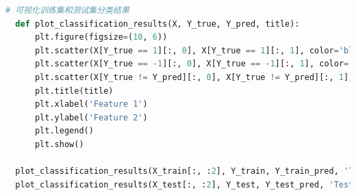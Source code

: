 \documentclass[12pt]{article}
\begin{document}
\begin{lstlisting}[language=Python]
  # 可视化训练集和测试集分类结果
  def plot_classification_results(X, Y_true, Y_pred, title):
      plt.figure(figsize=(10, 6))
      plt.scatter(X[Y_true == 1][:, 0], X[Y_true == 1][:, 1], color='blue', label='Positive Class')
      plt.scatter(X[Y_true == -1][:, 0], X[Y_true == -1][:, 1], color='red', label='Negative Class')
      plt.scatter(X[Y_true != Y_pred][:, 0], X[Y_true != Y_pred][:, 1], color='yellow', edgecolor='black', label='Misclassified')
      plt.title(title)
      plt.xlabel('Feature 1')
      plt.ylabel('Feature 2')
      plt.legend()
      plt.show()
  
  plot_classification_results(X_train[:, :2], Y_train, Y_train_pred, 'Training Set Classification(QP)')
  plot_classification_results(X_test[:, :2], Y_test, Y_test_pred, 'Test Set Classification(QP)')  
  
\end{lstlisting}
\end{document}
